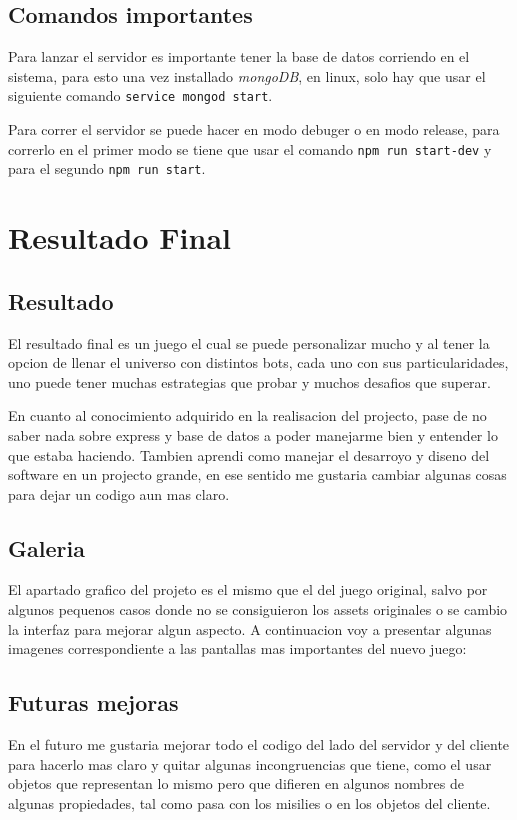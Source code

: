 \documentclass{article}
\begin{document}
\subsection{Comandos importantes}
Para lanzar el servidor es importante tener la base de datos corriendo en el sistema, para esto una vez installado \textit{mongoDB}, en linux, solo hay que usar el siguiente comando \texttt{service mongod start}.

Para correr el servidor se puede hacer en modo debuger o en modo release, para correrlo en el primer modo se tiene que usar el comando \texttt{npm run start-dev} y para el segundo \texttt{npm run start}.

\section{Resultado Final}
\subsection{Resultado}
El resultado final es un juego el cual se puede personalizar mucho y al tener la opcion de llenar el universo con distintos bots, cada uno con sus particularidades, uno puede tener muchas estrategias que probar y muchos desafios que superar.

En cuanto al conocimiento adquirido en la realisacion del projecto, pase de no saber nada sobre express y base de datos a poder manejarme bien y entender lo que estaba haciendo. Tambien aprendi como manejar el desarroyo y diseno del software en un projecto grande, en ese sentido me gustaria cambiar algunas cosas para dejar un codigo aun mas claro.

\subsection{Galeria}
El apartado grafico del projeto es el mismo que el del juego original, salvo por algunos pequenos casos donde no se consiguieron los assets originales o se cambio la interfaz para mejorar algun aspecto. A continuacion voy a presentar algunas imagenes correspondiente a las pantallas mas importantes del nuevo juego:


\subsection{Futuras mejoras}
En el futuro me gustaria mejorar todo el codigo del lado del servidor y del cliente para hacerlo mas claro y quitar algunas incongruencias que tiene, como el usar objetos que representan lo mismo pero que difieren en algunos nombres de algunas propiedades, tal como pasa con los misilies o en los objetos del cliente.
\end{document}
